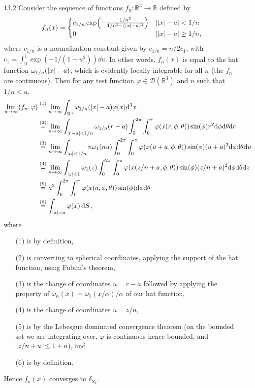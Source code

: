 \documentclass[11pt]{article}
\newcommand{\eq}[1]{\overset{(#1)}{=}}
\begin{document}
\begin{enumerate}
    \item[13.2] Consider the sequence of functions $f_n\colon\mathbb{R}^3\to\mathbb{R}$ defined by \[f_n(x) = \begin{cases}
        c_{1/n}\exp(-\frac{1/n^2}{1/n^2- (\abs{x}-a)^2}) & \abs{\abs{x}-a}<1/n\\
        0 & \abs{\abs{x}-a}\geq 1/n,
    \end{cases}\] where $c_{1/n}$ is a normalization constant given by $c_{1/n} = n/2c_1$, with $c_1 = \int_0^1\exp(-1/(1-u^2))\dd{u}$. In other words, $f_n(x)$ is equal to the hat function $\omega_{1/n}(\abs{x}-a)$, which is evidently locally integrable for all $n$ (the $f_n$ are continuous). Then for any test function $\varphi\in \mathcal{D}(\mathbb{R}^3)$ and $n$ such that $1/n<a$,
    \begin{align*}
        \lim_{n\to\infty} (f_n,\varphi) &\eq{1} \lim_{n\to\infty}\int_{\mathbb{R}^3}\omega_{1/n}(\abs{x}-a)\varphi(x)\dd[3]x\\
        &\eq{2} \lim_{n\to\infty}\int_{\abs{r-a}<1/n}\omega_{1/n}(r-a)\int_0^{2\pi}\int_0^\pi\varphi(x(r,\phi,\theta))\sin(\phi)r^2 \dd\phi \dd\theta \dd r\\
        &\eq{3} \lim_{n\to\infty}\int_{\abs{u}<1/n}n\omega_{1}(nu)\int_0^{2\pi}\int_0^\pi\varphi(x(u+a,\phi,\theta))\sin(\phi)(u+a)^2 \dd\phi \dd\theta \dd u\\
        &\eq{4} \lim_{n\to\infty}\int_{\abs{z}<1}\omega_{1}(z)\int_0^{2\pi}\int_0^\pi\varphi(x(z/n+a,\phi,\theta))\sin(\phi)(z/n+a)^2 \dd\phi \dd\theta \dd z\\
        &\eq{5} a^2\int_0^{2\pi}\int_0^\pi\varphi(x(a,\phi,\theta))\sin(\phi) \dd\phi \dd\theta\\
        &\eq{6} \int_{\abs{x}=a}\varphi(x)\dd{S},
    \end{align*}where \begin{enumerate}
        \item[(1)] is by definition,
        \item[(2)] is converting to spherical coordinates, applying the support of the hat function, using Fubini's theorem,
        \item[(3)] is the change of coordinates $u = r-a$ followed by applying the property of $\omega_\alpha(x) = \omega_1(x/\alpha)/\alpha$ of our hat function,
        \item[(4)] is the change of coordinates $u = z/n$,
        \item[(5)] is by the Lebesgue dominated convergence theorem (on the bounded set we are integrating over, $\varphi$ is continuous hence bounded, and $\abs{z/n+a}\leq 1+a$), and
        \item[(6)] is by definition.
    \end{enumerate} Hence $f_n(x)$ converges to $\delta_{S_a}$.


\end{enumerate}
\end{document}
